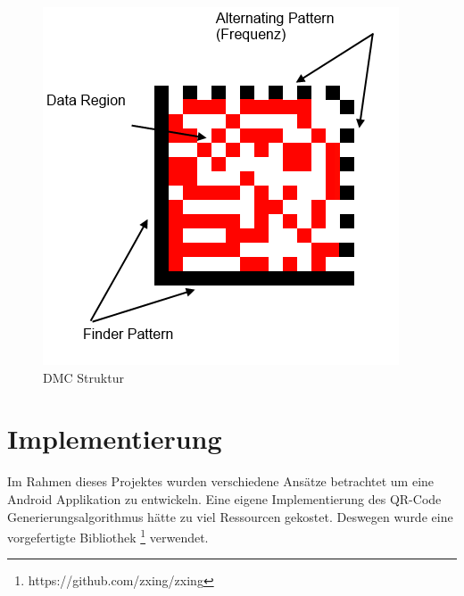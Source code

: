 \documentclass[12pt,					%
							 oneside,			%
							 a4paper,			%
							 halfparskip,		%
							 liststotoc,			%
							 bibtotoc,			%
							 fleqn,				%
							 pointlessnumbers]	%
							 {scrreprt}
\begin{document}
\begin{figure}[ht]
\centering   
	 \includegraphics[scale=0.5]{pictures/dmc} 
 	\caption{DMC Struktur}
\end{figure}

\chapter{Implementierung}	
Im Rahmen dieses Projektes wurden verschiedene Ansätze betrachtet um eine Android Applikation zu entwickeln. Eine eigene Implementierung des QR-Code Generierungsalgorithmus hätte zu viel Ressourcen gekostet. Deswegen wurde eine vorgefertigte Bibliothek \footnote{https://github.com/zxing/zxing} verwendet. 
\end{document}
